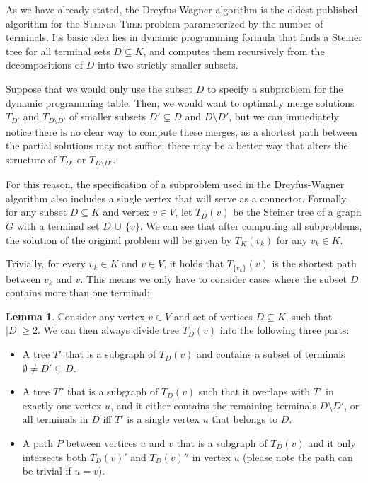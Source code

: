 \documentclass[thesis=M,english,hidelinks]{FITthesis}[2012/10/20]
\theoremstyle{definition}
\newtheorem{lemma}{Lemma}
\begin{document}
As we have already stated, the Dreyfus-Wagner algorithm \cite{Dreyfus1971} is the oldest published algorithm for the
\textsc{Steiner Tree} problem parameterized by the number of terminals. Its basic idea lies in dynamic programming
formula that finds a Steiner tree for all terminal sets $D \subseteq K$, and computes them recursively from the
decompositions of $D$ into two strictly smaller subsets.

Suppose that we would only use the subset $D$ to specify a subproblem for the dynamic programming table. Then, we would
want to optimally merge solutions $T_{D'}$ and $T_{D \setminus D'}$ of smaller subsets $D' \subsetneq D$
and $D \setminus D'$, but we can immediately notice there is no clear way to compute these merges, as a shortest path
between the partial solutions may not suffice; there may be a better way that alters the structure of $T_{D'}$ or $T_{D
\setminus D'}$.

For this reason, the specification of a subproblem used in the Dreyfus-Wagner algorithm also includes a single vertex
that will serve as a connector. Formally, for any subset $D \subseteq K$ and vertex $v \in V$, let $T_D(v)$ be the
Steiner tree of a graph $G$ with a terminal set $D\,\cup\,\{v\}$. We can see that after computing all subproblems, the
solution of the original problem will be given by $T_K(v_k)$ for any $v_k \in K$.

Trivially, for every $v_k \in K$ and $v \in V$, it holds that $T_{\{v_k\}}(v)$ is the shortest path between $v_k$ and
$v$. This means we only have to consider cases where the subset $D$ contains more than one terminal:

\begin{lemma}
    \label{dw:partitions}
    Consider any vertex $v \in V$ and set of vertices $D \subseteq K$, such that $|D| \geq 2$. We can then always divide
    tree $T_D(v)$ into the following three parts:
    \begin{itemize}
        \item A tree $T'$ that is a subgraph of $T_D(v)$ and contains a subset of terminals $\emptyset \neq D'
            \subsetneq D$.

        \item A tree $T''$ that is a subgraph of $T_D(v)$ such that it overlaps with $T'$ in exactly one
            vertex $u$, and it either contains the remaining terminals $D \setminus D'$, or all terminals in $D$ iff
            $T'$ is a single vertex $u$ that belongs to $D$.

        \item A path $P$ between vertices $u$ and $v$ that is a subgraph of $T_D(v)$ and it only intersects
            both $T_D(v)'$ and $T_D(v)''$ in vertex $u$ (please note the path can be trivial if $u = v$).
    \end{itemize}
\end{lemma}
\end{document}
